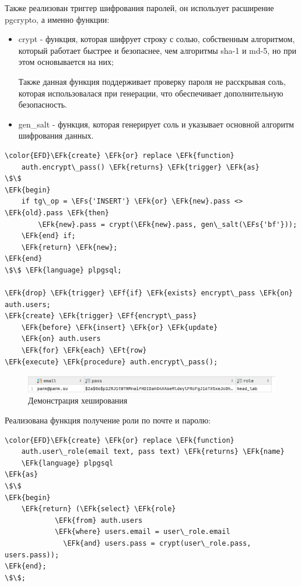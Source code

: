 \documentclass[14pt]{extarticle}
\newcommand{\EFs}[1]{\textcolor{EFs}{#1}} %
\newcommand{\EFk}[1]{\textcolor{EFk}{#1}} %
\newcommand{\EFf}[1]{\textcolor{EFf}{#1}} %
\newcommand{\EFt}[1]{\textcolor{EFt}{#1}} %
\begin{document}
Также реализован триггер шифрования паролей, он использует расширение pgcrypto, а
именно функции:
\begin{itemize}
\item crypt - функция, которая шифрует строку с солью,
собственным алгоритмом, который работает быстрее и безопаснее,
чем алгоритмы sha-1 и md-5, но при этом основывается на них;

Также данная функция поддерживает проверку пароля не расскрывая соль, которая использовалася при генерации,
что обеспечивает дополнительную безопасность.
\item gen\_​salt - функция, которая генерирует соль и указывает основной алгоритм шифрования данных.
\end{itemize}


\begin{Code}
\begin{Verbatim}
\color{EFD}\EFk{create} \EFk{or} replace \EFk{function}
    auth.encrypt\_pass() \EFk{returns} \EFk{trigger} \EFk{as}
\$\$
\EFk{begin}
    if tg\_op = \EFs{'INSERT'} \EFk{or} \EFk{new}.pass <> \EFk{old}.pass \EFk{then}
        \EFk{new}.pass = crypt(\EFk{new}.pass, gen\_salt(\EFs{'bf'}));
    \EFk{end} if;
    \EFk{return} \EFk{new};
\EFk{end}
\$\$ \EFk{language} plpgsql;

\EFk{drop} \EFk{trigger} \EFf{if} \EFk{exists} encrypt\_pass \EFk{on} auth.users;
\EFk{create} \EFk{trigger} \EFf{encrypt\_pass}
    \EFk{before} \EFk{insert} \EFk{or} \EFk{update}
    \EFk{on} auth.users
    \EFk{for} \EFk{each} \EFt{row}
\EFk{execute} \EFk{procedure} auth.encrypt\_pass();
\end{Verbatim}
\end{Code}

\begin{figure}[H]
\centering
\includegraphics[width=.9\linewidth]{images/2023-05-02_09-57-33_screenshot.png}
\caption{Демонстрация хеширования}
\end{figure}


Реализована функция получение роли по почте и паролю:

\begin{Code}
\begin{Verbatim}
\color{EFD}\EFk{create} \EFk{or} replace \EFk{function}
    auth.user\_role(email text, pass text) \EFk{returns} \EFk{name}
    \EFk{language} plpgsql
\EFk{as}
\$\$
\EFk{begin}
    \EFk{return} (\EFk{select} \EFk{role}
            \EFk{from} auth.users
            \EFk{where} users.email = user\_role.email
              \EFk{and} users.pass = crypt(user\_role.pass, users.pass));
\EFk{end};
\$\$;
\end{Verbatim}
\end{Code}
\end{document}
